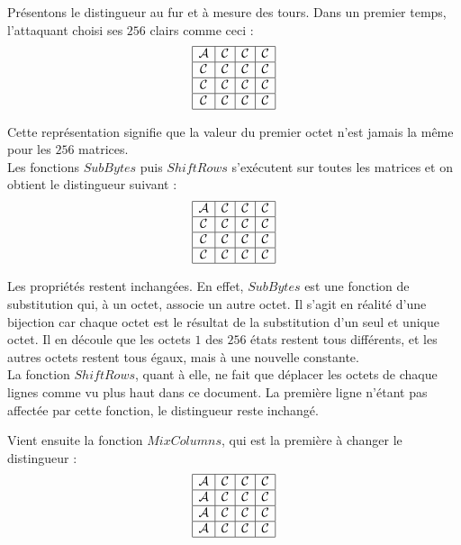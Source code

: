 \indent Présentons le distingueur au fur et à mesure des tours. Dans un premier temps, l'attaquant choisi ses $256$ clairs comme ceci : \\
$$
\begin{array}{|c|c|c|c|}
    \hline
    \mathcal{A} & \mathcal{C} & \mathcal{C} & \mathcal{C} \\
    \hline
    \mathcal{C} & \mathcal{C} & \mathcal{C} & \mathcal{C} \\
    \hline
    \mathcal{C} & \mathcal{C} & \mathcal{C} & \mathcal{C} \\
    \hline
    \mathcal{C} & \mathcal{C} & \mathcal{C} & \mathcal{C} \\
    \hline
\end{array}
$$

\indent Cette représentation signifie que la valeur du premier octet n'est jamais la même pour les $256$ matrices. \\
Les fonctions $SubBytes$ puis $ShiftRows$ s'exécutent sur toutes les matrices et on obtient le distingueur suivant : \\
$$
\begin{array}{|c|c|c|c|}
    \hline
    \mathcal{A} & \mathcal{C} & \mathcal{C} & \mathcal{C} \\
    \hline
    \mathcal{C} & \mathcal{C} & \mathcal{C} & \mathcal{C} \\
    \hline
    \mathcal{C} & \mathcal{C} & \mathcal{C} & \mathcal{C} \\
    \hline
    \mathcal{C} & \mathcal{C} & \mathcal{C} & \mathcal{C} \\
    \hline
\end{array}
$$

\indent Les propriétés restent inchangées. En effet, $SubBytes$ est une fonction de substitution qui, à un octet, associe un autre octet. Il s'agit en réalité d'une bijection car chaque octet est le résultat de la substitution d'un seul et unique octet. Il en découle que les octets $1$ des $256$ états restent tous différents, et les autres octets restent tous égaux, mais à une nouvelle constante. \\
\indent La fonction $ShiftRows$, quant à elle, ne fait que déplacer les octets de chaque lignes comme vu plus haut dans ce document. La première ligne n'étant pas affectée par cette fonction, le distingueur reste inchangé.

\vspace{0.5 cm}

\indent Vient ensuite la fonction $MixColumns$, qui est la première à changer le distingueur : \\
$$
\begin{array}{|c|c|c|c|}
    \hline
    \mathcal{A} & \mathcal{C} & \mathcal{C} & \mathcal{C} \\
    \hline
    \mathcal{A} & \mathcal{C} & \mathcal{C} & \mathcal{C} \\
    \hline
    \mathcal{A} & \mathcal{C} & \mathcal{C} & \mathcal{C} \\
    \hline
    \mathcal{A} & \mathcal{C} & \mathcal{C} & \mathcal{C} \\
    \hline
\end{array}
$$


